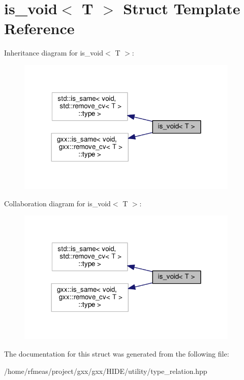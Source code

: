 \hypertarget{structis__void}{}\section{is\+\_\+void$<$ T $>$ Struct Template Reference}
\label{structis__void}


Inheritance diagram for is\+\_\+void$<$ T $>$\+:
\nopagebreak
\begin{figure}[H]
\begin{center}
\leavevmode
\includegraphics[width=300pt]{structis__void__inherit__graph}
\end{center}
\end{figure}


Collaboration diagram for is\+\_\+void$<$ T $>$\+:
\nopagebreak
\begin{figure}[H]
\begin{center}
\leavevmode
\includegraphics[width=300pt]{structis__void__coll__graph}
\end{center}
\end{figure}


The documentation for this struct was generated from the following file\+:\begin{DoxyCompactItemize}
\item 
/home/rfmeas/project/gxx/gxx/\+H\+I\+D\+E/utility/type\+\_\+relation.\+hpp\end{DoxyCompactItemize}
